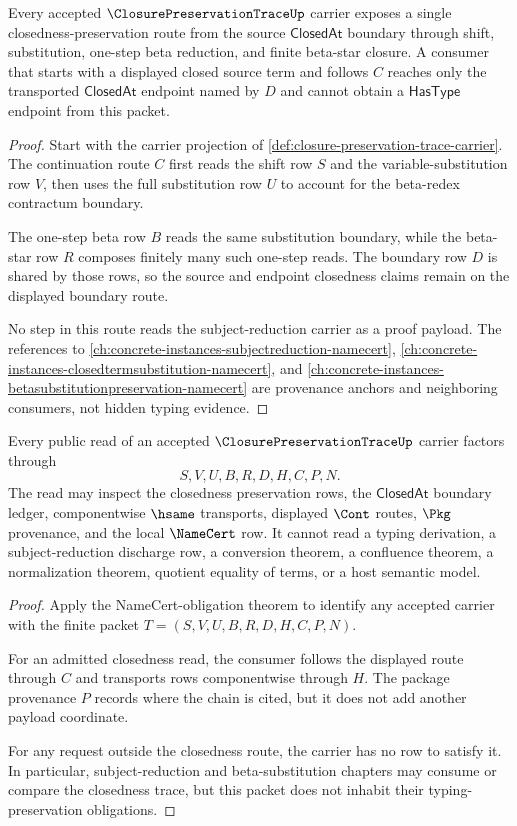 \begin{theorem}
\label{thm:closure-preservation-trace-closedness-route}
Every accepted $\ClosurePreservationTraceUp$ carrier exposes a single closedness-preservation route from the source $\mathsf{ClosedAt}$ boundary through shift, substitution, one-step beta reduction, and finite beta-star closure. A consumer that starts with a displayed closed source term and follows $C$ reaches only the transported $\mathsf{ClosedAt}$ endpoint named by $D$ and cannot obtain a $\mathsf{HasType}$ endpoint from this packet.
\end{theorem}
\begin{proof}
Start with the carrier projection of \autoref{def:closure-preservation-trace-carrier}. The continuation route $C$ first reads the shift row $S$ and the variable-substitution row $V$, then uses the full substitution row $U$ to account for the beta-redex contractum boundary.

The one-step beta row $B$ reads the same substitution boundary, while the beta-star row $R$ composes finitely many such one-step reads. The boundary row $D$ is shared by those rows, so the source and endpoint closedness claims remain on the displayed boundary route.

No step in this route reads the subject-reduction carrier as a proof payload. The references to \autoref{ch:concrete-instances-subjectreduction-namecert}, \autoref{ch:concrete-instances-closedtermsubstitution-namecert}, and \autoref{ch:concrete-instances-betasubstitutionpreservation-namecert} are provenance anchors and neighboring consumers, not hidden typing evidence.
\end{proof}

\begin{theorem}
\label{thm:closure-preservation-trace-nonescape}
Every public read of an accepted $\ClosurePreservationTraceUp$ carrier factors through
$$
S,V,U,B,R,D,H,C,P,N.
$$
The read may inspect the closedness preservation rows, the $\mathsf{ClosedAt}$ boundary ledger, componentwise $\hsame$ transports, displayed $\Cont$ routes, $\Pkg$ provenance, and the local $\NameCert$ row. It cannot read a typing derivation, a subject-reduction discharge row, a conversion theorem, a confluence theorem, a normalization theorem, quotient equality of terms, or a host semantic model.
\end{theorem}
\begin{proof}
Apply the NameCert-obligation theorem to identify any accepted carrier with the finite packet $T=(S,V,U,B,R,D,H,C,P,N)$.

For an admitted closedness read, the consumer follows the displayed route through $C$ and transports rows componentwise through $H$. The package provenance $P$ records where the chain is cited, but it does not add another payload coordinate.

For any request outside the closedness route, the carrier has no row to satisfy it. In particular, subject-reduction and beta-substitution chapters may consume or compare the closedness trace, but this packet does not inhabit their typing-preservation obligations.
\end{proof}

